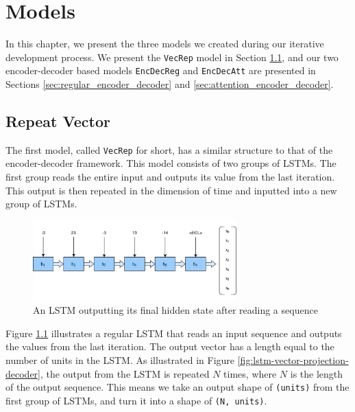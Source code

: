 
\chapter{Models}
\label{ch:models}
In this chapter, we present the three models we created during our iterative development process. We present the {\tt VecRep} model in Section \ref{sec:repeat_vector}, and our two encoder-decoder based models {\tt EncDecReg} and {\tt EncDecAtt} are presented in Sections \ref{sec:regular_encoder_decoder} and \ref{sec:attention_encoder_decoder}.


\section{Repeat Vector}
\label{sec:repeat_vector}
The first model, called {\tt VecRep} for short, has a similar structure to that of the encoder-decoder framework. This model consists of two groups of LSTMs. The first group reads the entire input and outputs its value from the last iteration. This output is then repeated in the dimension of time and inputted into a new group of LSTMs.

\begin{figure}[ht]
    \centering
    \includegraphics[width=0.7\textwidth]{fig/development_process/lstm-vector-projection-encoder.png}
    \caption{An LSTM outputting its final hidden state after reading a sequence}
    \label{fig:lstm-vector-projection-encoder}
\end{figure}

Figure \ref{fig:lstm-vector-projection-encoder} illustrates a regular LSTM that reads an input sequence and outputs the values from the last iteration. The output vector has a length equal to the number of units in the LSTM. As illustrated in Figure \ref{fig:lstm-vector-projection-decoder}, the output from the LSTM is repeated \(N\) times, where \(N\) is the length of the output sequence. This means we take an output shape of {\tt (units)} from the first group of LSTMs, and turn it into a shape of {\tt (N, units)}.


